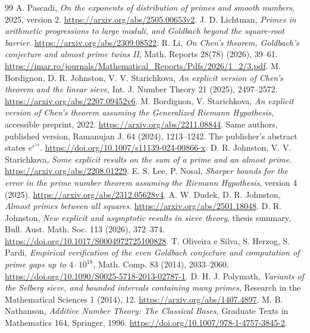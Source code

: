 \documentclass[11pt]{article}
\begin{document}
\begin{thebibliography}{99}
 A. Pascadi,
\emph{On the exponents of distribution of primes and smooth numbers},
2025, version 2. \url{https://arxiv.org/abs/2505.00653v2}.
 J. D. Lichtman,
\emph{Primes in arithmetic progressions to large moduli, and Goldbach
beyond the square-root barrier}.
\url{https://arxiv.org/abs/2309.08522}.
 R. Li,
\emph{On Chen's theorem, Goldbach's conjecture and almost prime twins II},
Math. Reports 28(78) (2026), 39--61.
\url{https://imar.ro/journals/Mathematical_Reports/Pdfs/2026/1_2/3.pdf}.
 M. Bordignon, D. R. Johnston, V. V. Starichkova,
\emph{An explicit version of Chen's theorem and the linear sieve},
Int. J. Number Theory 21 (2025), 2497--2572.
\url{https://arxiv.org/abs/2207.09452v6}.
 M. Bordignon, V. Starichkova,
\emph{An explicit version of Chen's theorem assuming the Generalized
Riemann Hypothesis}, accessible preprint, 2022.
\url{https://arxiv.org/abs/2211.08844}.
 Same authors, published version, Ramanujan J. 64
(2024), 1213--1242. The publisher's abstract states $e^{e^{14}}$.
\url{https://doi.org/10.1007/s11139-024-00866-x}.
 D. R. Johnston, V. V. Starichkova,
\emph{Some explicit results on the sum of a prime and an almost prime}.
\url{https://arxiv.org/abs/2208.01229}.
 E. S. Lee, P. Nosal,
\emph{Sharper bounds for the error in the prime number theorem assuming
the Riemann Hypothesis}, version 4 (2025).
\url{https://arxiv.org/abs/2312.05628v4}.
 A. W. Dudek, D. R. Johnston,
\emph{Almost primes between all squares}.
\url{https://arxiv.org/abs/2501.18048}.
 D. R. Johnston,
\emph{New explicit and asymptotic results in sieve theory}, thesis
summary, Bull. Aust. Math. Soc. 113 (2026), 372--374.
\url{https://doi.org/10.1017/S0004972725100828}.
 T. Oliveira e Silva, S. Herzog, S. Pardi,
\emph{Empirical verification of the even Goldbach conjecture and
computation of prime gaps up to $4\cdot10^{18}$}, Math. Comp. 83
(2014), 2033--2060.
\url{https://doi.org/10.1090/S0025-5718-2013-02787-1}.
 D. H. J. Polymath,
\emph{Variants of the Selberg sieve, and bounded intervals containing
many primes}, Research in the Mathematical Sciences 1 (2014), 12.
\url{https://arxiv.org/abs/1407.4897}.
 M. B. Nathanson,
\emph{Additive Number Theory: The Classical Bases}, Graduate Texts
in Mathematics 164, Springer, 1996.
\url{https://doi.org/10.1007/978-1-4757-3845-2}.
\end{thebibliography}
\end{document}
